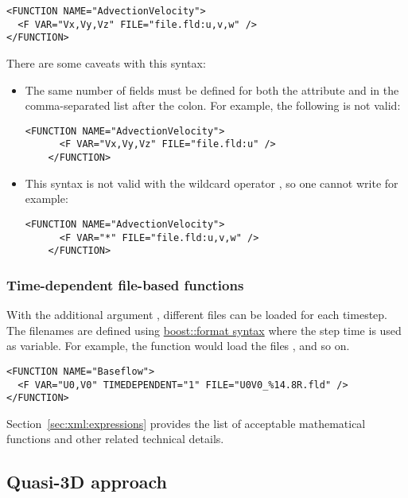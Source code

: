 \begin{lstlisting}[style=XMLStyle]
<FUNCTION NAME="AdvectionVelocity">
  <F VAR="Vx,Vy,Vz" FILE="file.fld:u,v,w" />
</FUNCTION>
\end{lstlisting}

There are some caveats with this syntax:

\begin{itemize}
  \item The same number of fields must be defined for both the 
  attribute and in the comma-separated list after the colon. For example, the
  following is not valid:
  \begin{lstlisting}[style=XMLStyle,gobble=4]
    <FUNCTION NAME="AdvectionVelocity">
      <F VAR="Vx,Vy,Vz" FILE="file.fld:u" />
    </FUNCTION>\end{lstlisting}
  \item This syntax is not valid with the wildcard operator \inltt{*}, so one
  cannot write for example:
  \begin{lstlisting}[style=XMLStyle,gobble=4]
    <FUNCTION NAME="AdvectionVelocity">
      <F VAR="*" FILE="file.fld:u,v,w" />
    </FUNCTION>
  \end{lstlisting}
\end{itemize}

\subsubsection{Time-dependent file-based functions}

With the additional argument , different files can be
loaded for each timestep. The filenames are defined using
\href{http://www.boost.org/doc/libs/1_56_0/libs/format/doc/format.html#syntax}{boost::format
  syntax} where the step time is used as variable. For example, the function
 would load the files ,
 and so on.

\begin{lstlisting}[style=XMLStyle]
<FUNCTION NAME="Baseflow">
  <F VAR="U0,V0" TIMEDEPENDENT="1" FILE="U0V0_%14.8R.fld" />
</FUNCTION>
\end{lstlisting}

Section~\ref{sec:xml:expressions} provides the list of acceptable
mathematical functions and other related technical details.

\subsection{Quasi-3D approach}

